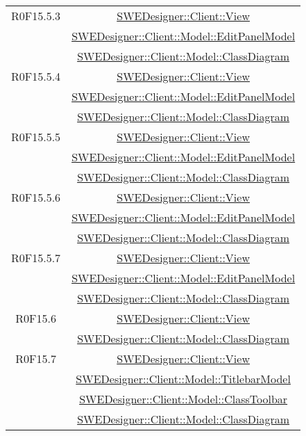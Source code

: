 \documentclass[../SpecificaTecnica.tex]{subfiles}
\begin{document}
\begin{longtable}{|c|c|}
		R0F15.5.3 & \hyperlink{SWEDesigner::Client::View}{SWEDesigner::Client::View}\\& \hyperlink{SWEDesigner::Client::Model::EditPanelModel}{SWEDesigner::Client::Model::EditPanelModel}\\& \hyperlink{SWEDesigner::Client::Model::ClassDiagram}{SWEDesigner::Client::Model::ClassDiagram} \\\hline
		R0F15.5.4 & \hyperlink{SWEDesigner::Client::View}{SWEDesigner::Client::View}\\& \hyperlink{SWEDesigner::Client::Model::EditPanelModel}{SWEDesigner::Client::Model::EditPanelModel}\\& \hyperlink{SWEDesigner::Client::Model::ClassDiagram}{SWEDesigner::Client::Model::ClassDiagram} \\\hline
		R0F15.5.5 & \hyperlink{SWEDesigner::Client::View}{SWEDesigner::Client::View}\\& \hyperlink{SWEDesigner::Client::Model::EditPanelModel}{SWEDesigner::Client::Model::EditPanelModel}\\& \hyperlink{SWEDesigner::Client::Model::ClassDiagram}{SWEDesigner::Client::Model::ClassDiagram} \\\hline
		R0F15.5.6 & \hyperlink{SWEDesigner::Client::View}{SWEDesigner::Client::View}\\& \hyperlink{SWEDesigner::Client::Model::EditPanelModel}{SWEDesigner::Client::Model::EditPanelModel}\\& \hyperlink{SWEDesigner::Client::Model::ClassDiagram}{SWEDesigner::Client::Model::ClassDiagram} \\\hline
		R0F15.5.7 & \hyperlink{SWEDesigner::Client::View}{SWEDesigner::Client::View}\\& \hyperlink{SWEDesigner::Client::Model::EditPanelModel}{SWEDesigner::Client::Model::EditPanelModel}\\& \hyperlink{SWEDesigner::Client::Model::ClassDiagram}{SWEDesigner::Client::Model::ClassDiagram} \\\hline
		R0F15.6 & \hyperlink{SWEDesigner::Client::View}{SWEDesigner::Client::View}\\& \hyperlink{SWEDesigner::Client::Model::ClassDiagram}{SWEDesigner::Client::Model::ClassDiagram}\\\hline
		R0F15.7 & \hyperlink{SWEDesigner::Client::View}{SWEDesigner::Client::View}\\& \hyperlink{SWEDesigner::Client::Model::TitlebarModel}{SWEDesigner::Client::Model::TitlebarModel}\\& \hyperlink{SWEDesigner::Client::Model::ClassToolbar}{SWEDesigner::Client::Model::ClassToolbar}\\& \hyperlink{SWEDesigner::Client::Model::ClassDiagram}{SWEDesigner::Client::Model::ClassDiagram}\\\hline

\end{longtable}
\end{document}
